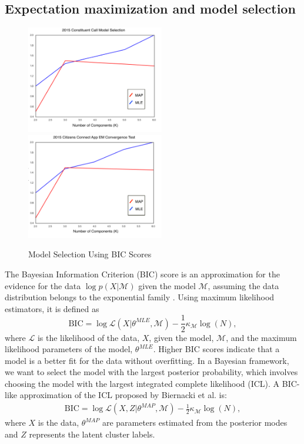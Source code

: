 \documentclass[twoside]{article}
\theoremstyle{theorem}
\theoremstyle{theorem}
\theoremstyle{theorem}
\theoremstyle{lemma}
\theoremstyle{definition}
\theoremstyle{example}
\begin{document}
\subsection{Expectation maximization and model selection}
\begin{figure}[h!]
\begin{center}
\includegraphics[width=60mm]{Call_bic}
\includegraphics[width=60mm]{App_bic}
\caption{Model Selection Using BIC Scores}
\end{center}\label{fig:bic}
\vskip -0.2in
\end{figure} 
The Bayesian Information Criterion (BIC) score is an approximation for the evidence for the data $\log p(X | \mathcal{M})$ given the model $\mathcal{M}$, assuming the data distribution belongs to the exponential family \cite{Bishop}. Using maximum likelihood estimators, it is defined as 
\begin{equation}
\mathrm{BIC} = \log\mathcal{L}(X | \theta^{MLE}, \mathcal{M}) - \frac{1}{2} \kappa_\mathcal{M}  \log(N),
\end{equation}
where $\mathcal{L}$ is the likelihood of the data, $X$, given the model, $\mathcal{M}$, and the maximum likelihood parameters of the model, $\theta^{MLE}$. Higher BIC scores indicate that a model is a better fit for the data without overfitting. In a Bayesian framework, we want to select the model with the largest posterior probability, which involves choosing the model with the largest integrated complete likelihood (ICL). A BIC-like approximation of the ICL proposed by Biernacki et al. \cite{Biernacki} is: 
\begin{align}
\mathrm{BIC} = \log \mathcal{L}(X, Z | \theta^{MAP},  \mathcal{M}) -  \frac{1}{2} \kappa_\mathcal{M} \log(N),
\end{align}
where $X$ is the data, $\theta^{MAP}$ are parameters estimated from the posterior modes and $Z$ represents the latent cluster labels.
\end{document}
